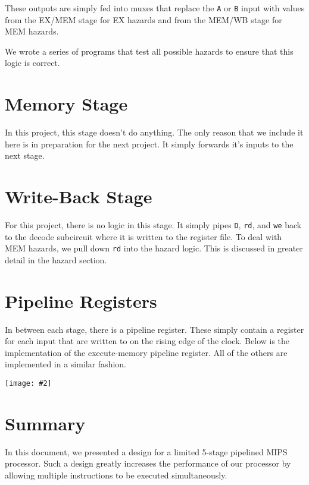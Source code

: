 \documentclass[10pt]{article}
\newcommand{\diagram}[2][1]{\begin{center}\texttt{[image: \#2]}\end{center}}
\begin{document}
These outputs are simply fed into muxes that replace the \texttt{A} or \texttt{B} input with values from the EX/MEM stage for EX hazards and from the MEM/WB stage for MEM hazards.

We wrote a series of programs that test all possible hazards to ensure that this logic is correct.

\section{Memory Stage}
In this project, this stage doesn't do anything. The only reason that we include it here is in preparation for the next project.
It simply forwards it's inputs to the next stage. 

\section{Write-Back Stage}
For this project, there is no logic in this stage. It simply pipes \texttt{D}, \texttt{rd}, and \texttt{we} back to the decode subcircuit where it is written to the register file.
To deal with MEM hazards, we pull down \texttt{rd} into the hazard logic. This is discussed in greater detail in the hazard section.

\section{Pipeline Registers}
In between each stage, there is a pipeline register. These simply contain a register for each input that are written to on the rising edge of the clock.
Below is the implementation of the execute-memory pipeline register. All of the others are implemented in a similar fashion.
\diagram[0.6]{pipeline}

\section{Summary}
In this document, we presented a design for a limited 5-stage pipelined MIPS processor. Such a design greatly increases the performance of our processor by
allowing multiple instructions to be executed simultaneously.
\end{document}
